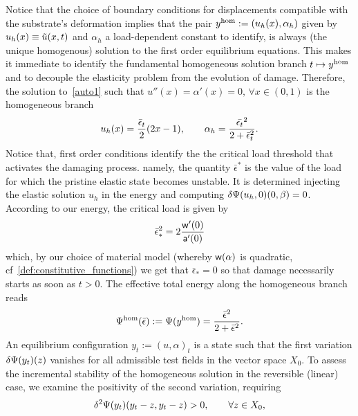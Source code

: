 Notice that the choice of boundary conditions for displacements compatible with the substrate's deformation implies that the pair $y^{\text{hom}}:=(u_h(x), \alpha_h)$ given by $u_h(x)\equiv \tilde u(x, t)$ and $\alpha_h$ a load-dependent constant to identify, is always (the unique homogenous) solution to the first order equilibrium equations. This makes it immediate to identify the fundamental homogeneous solution branch $t \mapsto y^{\text{hom}}$ and to decouple the elasticity problem from the  evolution of damage. 
Therefore, the solution to~\eqref{auto1} such that $u''(x)=\alpha'(x)= 0, \, \forall x\in (0, 1)$ is the homogeneous branch
\begin{equation}
u_h(x) =  \frac{\bar \epsilon_t}{2}(2x-1),\qquad\alpha_h = \frac{\Bar{\epsilon_t}^2}{2 + \Bar\epsilon_t^2}\label{eq:homo1}.
\end{equation}
Notice that,  
first order conditions identify the the critical load threshold that activates the damaging process. namely, the quantity $\bar\epsilon^*$ is the value of the load for which the pristine elastic state becomes unstable. It is determined injecting the elastic solution $u_h$ in the energy and computing $\delta \Psi(u_h, 0)(0, \beta)=0$.
According to our energy, the critical load is given by
\begin{equation}
    \bar{\epsilon}_*^2 = 2\frac{\mathsf{w}'(0)}{\mathsf{a}'(0)} 
\end{equation}
% 
which, by our choice of material model (whereby $\mathsf{w}(\alpha)$ is quadratic, cf~\eqref{def:constitutive_functions}) we get that   $\bar{\epsilon}_*=0$ so that damage necessarily starts as soon as $t>0$.
The effective {total} energy along the {homogeneous} branch reads  
\begin{equation}
    \label{eq:energy_homogeneous}
    \Psi^\text{hom}(\bar\epsilon) :=\Psi(y^{\text{hom}}) = \frac{\Bar{\epsilon}^2}{2 + \Bar\epsilon^2}.
\end{equation}
An equilibrium configuration $y_t:=(u,\alpha)_t$ is a state such that the first variation $\delta \Psi(y_t)(z)$ vanishes for all admissible test fields in the vector space $X_0$. 
To assess the incremental stability of the homogeneous solution in the reversible (linear) case, we examine the positivity of the second variation, requiring
\begin{equation}
\delta^2 \Psi(y_t)(y_t-z, y_t-z)>0, \qquad  \forall z\in X_0,
\label{eqn:linear_second_order_stability}
\end{equation} 
